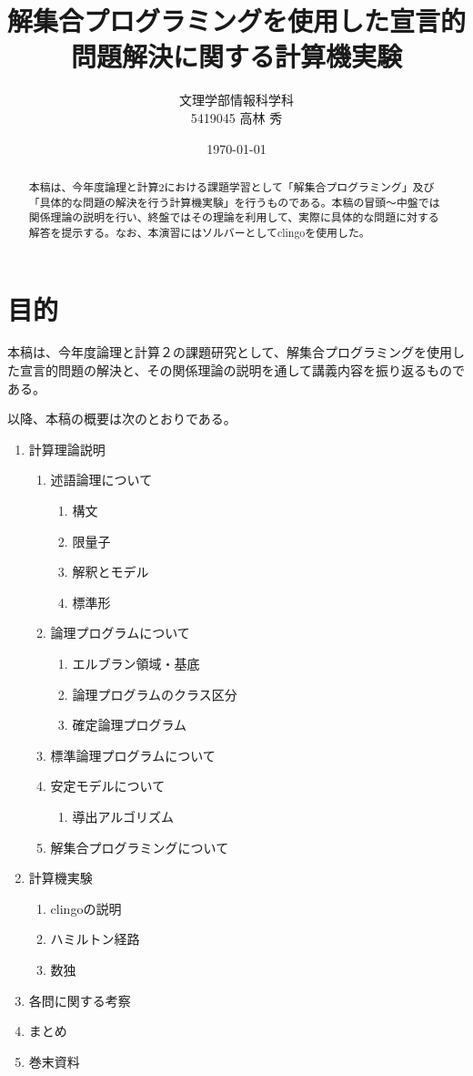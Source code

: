 \documentclass[dvipdfmx]{jsarticle}
\title{解集合プログラミングを使用した宣言的問題解決に関する計算機実験}
\author{文理学部情報科学科\\5419045 高林 秀}
\date{\today}
\begin{document}
\maketitle

\begin{abstract}
本稿は、今年度論理と計算2における課題学習として「解集合プログラミング」及び「具体的な問題の解決を行う計算機実験」を行うものである。本稿の冒頭〜中盤では関係理論の説明を行い、終盤ではその理論を利用して、実際に具体的な問題に対する解答を提示する。なお、本演習にはソルバーとしてclingoを使用した。
\end{abstract}

\section{目的}
本稿は、今年度論理と計算２の課題研究として、解集合プログラミングを使用した宣言的問題の解決と、その関係理論の説明を通して講義内容を振り返るものである。\par
以降、本稿の概要は次のとおりである。
\begin{enumerate}
  \item 計算理論説明
  \begin{enumerate}
    \item 述語論理について
    \begin{enumerate}
      \item 構文
      \item 限量子
      \item 解釈とモデル
      \item 標準形
    \end{enumerate}
    \item 論理プログラムについて
    \begin{enumerate}
      \item エルブラン領域・基底
      \item 論理プログラムのクラス区分
      \item 確定論理プログラム
    \end{enumerate}
    \item 標準論理プログラムについて
    \item 安定モデルについて
    \begin{enumerate}
      \item 導出アルゴリズム
    \end{enumerate}
    \item 解集合プログラミングについて
  \end{enumerate}
  \item 計算機実験
  \begin{enumerate}
    \item clingoの説明
    \item ハミルトン経路
    \item 数独
  \end{enumerate}
  \item 各問に関する考察
  \item まとめ
  \item 巻末資料
\end{enumerate}
\end{document}
